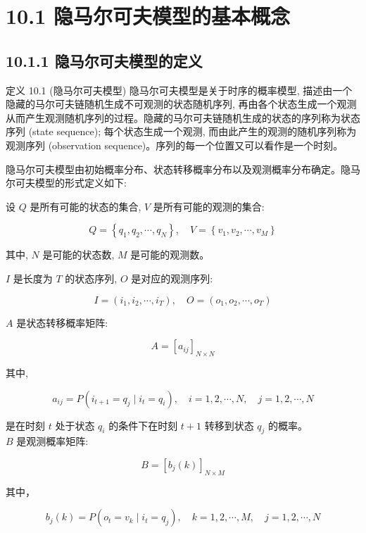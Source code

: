 \documentclass[10pt]{article}
\begin{document}
\section*{10.1 隐马尔可夫模型的基本概念}
\subsection*{10.1.1 隐马尔可夫模型的定义}
定义 10.1 (隐马尔可夫模型) 隐马尔可夫模型是关于时序的概率模型, 描述由一个隐藏的马尔可夫链随机生成不可观测的状态随机序列, 再由各个状态生成一个观测从而产生观测随机序列的过程。隐藏的马尔可夫链随机生成的状态的序列称为状态序列 (state sequence); 每个状态生成一个观测, 而由此产生的观测的随机序列称为观测序列 (observation sequence)。序列的每一个位置又可以看作是一个时刻。

隐马尔可夫模型由初始概率分布、状态转移概率分布以及观测概率分布确定。隐马尔可夫模型的形式定义如下:

设 $Q$ 是所有可能的状态的集合, $V$ 是所有可能的观测的集合:

$$
Q=\left\{q_{1}, q_{2}, \cdots, q_{N}\right\}, \quad V=\left\{v_{1}, v_{2}, \cdots, v_{M}\right\}
$$

其中, $N$ 是可能的状态数, $M$ 是可能的观测数。

$I$ 是长度为 $T$ 的状态序列, $O$ 是对应的观测序列:

$$
I=\left(i_{1}, i_{2}, \cdots, i_{T}\right), \quad O=\left(o_{1}, o_{2}, \cdots, o_{T}\right)
$$

$A$ 是状态转移概率矩阵:


\begin{equation*}
A=\left[a_{i j}\right]_{N \times N} \tag{10.1}
\end{equation*}


其中,


\begin{equation*}
a_{i j}=P\left(i_{t+1}=q_{j} \mid i_{t}=q_{i}\right), \quad i=1,2, \cdots, N, \quad j=1,2, \cdots, N \tag{10.2}
\end{equation*}


是在时刻 $t$ 处于状态 $q_{i}$ 的条件下在时刻 $t+1$ 转移到状态 $q_{j}$ 的概率。\\
$B$ 是观测概率矩阵:


\begin{equation*}
B=\left[b_{j}(k)\right]_{N \times M} \tag{10.3}
\end{equation*}


其中，


\begin{equation*}
b_{j}(k)=P\left(o_{t}=v_{k} \mid i_{t}=q_{j}\right), \quad k=1,2, \cdots, M, \quad j=1,2, \cdots, N \tag{10.4}
\end{equation*}
\end{document}
